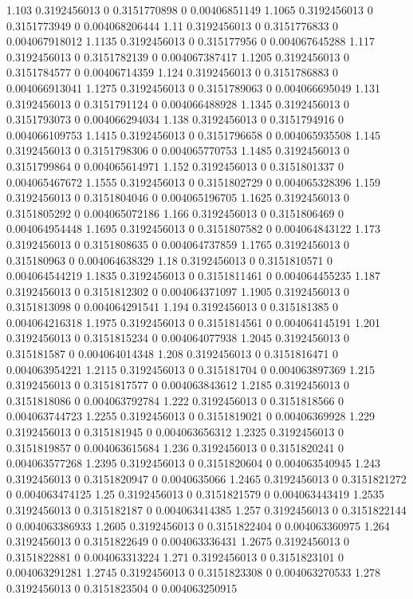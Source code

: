 {1.103 0.3192456013 0 0.3151770898 0 0.00406851149
1.1065 0.3192456013 0 0.3151773949 0 0.004068206444
1.11 0.3192456013 0 0.3151776833 0 0.004067918012
1.1135 0.3192456013 0 0.315177956 0 0.004067645288
1.117 0.3192456013 0 0.3151782139 0 0.004067387417
1.1205 0.3192456013 0 0.3151784577 0 0.00406714359
1.124 0.3192456013 0 0.3151786883 0 0.004066913041
1.1275 0.3192456013 0 0.3151789063 0 0.004066695049
1.131 0.3192456013 0 0.3151791124 0 0.004066488928
1.1345 0.3192456013 0 0.3151793073 0 0.004066294034
1.138 0.3192456013 0 0.3151794916 0 0.004066109753
1.1415 0.3192456013 0 0.3151796658 0 0.004065935508
1.145 0.3192456013 0 0.3151798306 0 0.004065770753
1.1485 0.3192456013 0 0.3151799864 0 0.004065614971
1.152 0.3192456013 0 0.3151801337 0 0.004065467672
1.1555 0.3192456013 0 0.3151802729 0 0.004065328396
1.159 0.3192456013 0 0.3151804046 0 0.004065196705
1.1625 0.3192456013 0 0.3151805292 0 0.004065072186
1.166 0.3192456013 0 0.3151806469 0 0.004064954448
1.1695 0.3192456013 0 0.3151807582 0 0.004064843122
1.173 0.3192456013 0 0.3151808635 0 0.004064737859
1.1765 0.3192456013 0 0.315180963 0 0.004064638329
1.18 0.3192456013 0 0.3151810571 0 0.004064544219
1.1835 0.3192456013 0 0.3151811461 0 0.004064455235
1.187 0.3192456013 0 0.3151812302 0 0.004064371097
1.1905 0.3192456013 0 0.3151813098 0 0.004064291541
1.194 0.3192456013 0 0.315181385 0 0.004064216318
1.1975 0.3192456013 0 0.3151814561 0 0.004064145191
1.201 0.3192456013 0 0.3151815234 0 0.004064077938
1.2045 0.3192456013 0 0.315181587 0 0.004064014348
1.208 0.3192456013 0 0.3151816471 0 0.004063954221
1.2115 0.3192456013 0 0.315181704 0 0.004063897369
1.215 0.3192456013 0 0.3151817577 0 0.004063843612
1.2185 0.3192456013 0 0.3151818086 0 0.004063792784
1.222 0.3192456013 0 0.3151818566 0 0.004063744723
1.2255 0.3192456013 0 0.3151819021 0 0.00406369928
1.229 0.3192456013 0 0.315181945 0 0.004063656312
1.2325 0.3192456013 0 0.3151819857 0 0.004063615684
1.236 0.3192456013 0 0.3151820241 0 0.004063577268
1.2395 0.3192456013 0 0.3151820604 0 0.004063540945
1.243 0.3192456013 0 0.3151820947 0 0.0040635066
1.2465 0.3192456013 0 0.3151821272 0 0.004063474125
1.25 0.3192456013 0 0.3151821579 0 0.004063443419
1.2535 0.3192456013 0 0.315182187 0 0.004063414385
1.257 0.3192456013 0 0.3151822144 0 0.004063386933
1.2605 0.3192456013 0 0.3151822404 0 0.004063360975
1.264 0.3192456013 0 0.3151822649 0 0.004063336431
1.2675 0.3192456013 0 0.3151822881 0 0.004063313224
1.271 0.3192456013 0 0.3151823101 0 0.004063291281
1.2745 0.3192456013 0 0.3151823308 0 0.004063270533
1.278 0.3192456013 0 0.3151823504 0 0.004063250915
}

